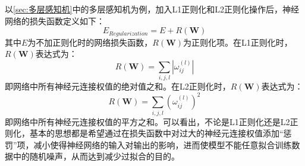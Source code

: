 \documentclass[a4paper]{ctexart}
\begin{document}
\begin{spacing}{1.3}
	以\ref{sec:多层感知机}中的多层感知机为例，加入L1正则化和L2正则化操作后，神经网络的损失函数定义如下：
	\begin{equation}
		E_{Regularization}=E+R(\bm W)
	\end{equation}
	其中$E$为不加正则化时的网络损失函数，$R(\bm W)$为正则化项。在L1正则化时，$R(\bm W)$表达式为：
	\begin{equation}
		R(\bm W)=\sum_{i,j,l}|\omega_{ij}^{(l)}|
	\end{equation}
	即网络中所有神经元连接权值的绝对值之和。在L2正则化时，$R(\bm W)$表达式为：
	\begin{equation}
		R(\bm W)=\sum_{i,j,l}(\omega_{ij}^{(l)})^2
	\end{equation}
	即网络中所有神经元连接权值的平方之和。可以看出，不论是L1正则化还是L2正则化，基本的思想都是希望通过在损失函数中对过大的神经元连接权值添加“惩罚”项，减小使得神经网络的输入对输出的影响，进而使模型不能任意拟合训练数据中的随机噪声，从而达到减少过拟合的目的。


\end{spacing}
\end{document}

